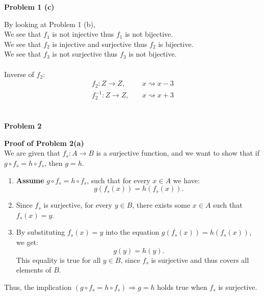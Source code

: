 \documentclass{article}
\begin{document}
\begin{flushleft}
   \textbf{\Large Problem 1 (c)}
\end{flushleft}

By looking at Problem 1 (b), \\
We see that \(f_1\) is not injective thus \(f_1\) is not bijective. \\
We see that \(f_2\) is injective and surjective thus \(f_2\) is bijective. \\
We see that \(f_3\) is not surjective thus \(f_3\) is not bijective. \\
\\
Inverse of \(f_2\):
\begin{align*}
   f_2: Z \rightarrow Z,& \quad x \rightsquigarrow x - 3 \\
   f_2^{-1}: Z \rightarrow Z,& \quad x \rightsquigarrow x + 3 \\
\end{align*}
\\

\begin{flushleft}
   \textbf{\Large Problem 2}
\end{flushleft}

\begin{flushleft}

   \textbf{Proof of Problem 2(a)}\\
   
   We are given that \( f_s : A \to B \) is a surjective function, and we want to show that if \( g \circ f_s = h \circ f_s \), then \( g = h \).

   \begin{enumerate}
      \item \textbf{Assume} \( g \circ f_s = h \circ f_s \), such that for every \( x \in A \) we have:
      \[
      g(f_s(x)) = h(f_s(x)).
      \]
      \item Since \( f_s \) is surjective, for every \( y \in B \), there exists some \( x \in A \) such that \( f_s(x) = y \).
      \item By substituting \( f_s(x) = y \) into the equation \( g(f_s(x)) = h(f_s(x)) \), we get:
      \[
      g(y) = h(y).
      \]
      This equality is true for all \( y \in B \), since \( f_s \) is surjective and thus covers all elements of \( B \).
   \end{enumerate}
   
   Thus, the implication \( (g \circ f_s = h \circ f_s) \Rightarrow g = h \) holds true when \( f_s \) is surjective.
\end{flushleft}
\end{document}
